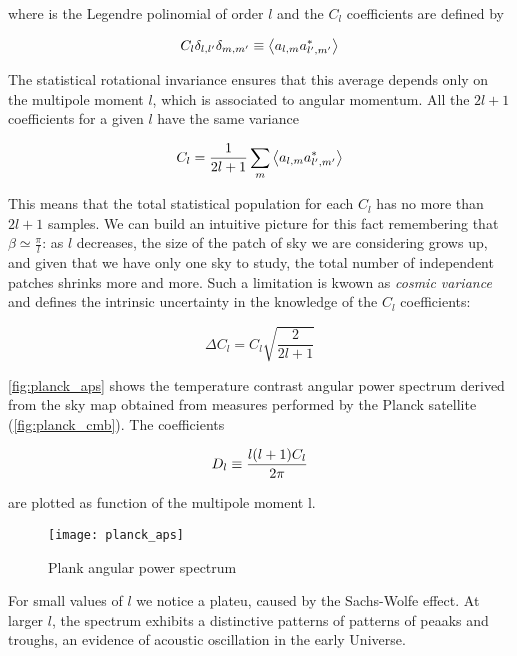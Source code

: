 where is the Legendre polinomial of order $l$ and the $C_l$ coefficients
are defined by

\begin{equation}
        C_l \delta_{l,l'} \delta_{m,m'} \equiv \expval{a_{l,m} a^*_{l',m'}}
\end{equation}

The statistical rotational
invariance ensures that this average depends only on the multipole moment
$l$, which is associated to angular momentum. All the $2l + 1$ coefficients
for a given $l$ have the same variance

\begin{equation}
        C_l = \frac{1}{2l + 1} \sum_m \expval{a_{l,m} a^*_{l',m'}} 
\end{equation}

This means that the total statistical population for each $C_l$ has no more
than $2l + 1$ samples. We can build an intuitive picture for this fact
remembering that $\beta \simeq \frac{\pi}{l}$: as $l$ decreases, the size of
the patch of sky we are considering grows up, and given that we have only
one sky to study, the total number of independent patches shrinks more and
more. Such a limitation is kwown as \emph{cosmic variance} and defines the
intrinsic uncertainty in the knowledge of the $C_l$ coefficients:

\begin{equation}
        \Delta C_l = C_l \sqrt{\frac{2}{2l + 1}} 
\end{equation}

\autoref{fig:planck_aps} shows the temperature contrast angular power
spectrum derived from the sky map obtained from measures performed by the
Planck satellite (\autoref{fig:planck_cmb}). The coefficients 

\begin{equation}
        D_l \equiv \frac{l\qty(l + 1)C_l}{2\pi}
\end{equation}

are plotted as function of the multipole moment l.

\begin{figure}
        \centering
        \texttt{[image: planck\_aps]}
        \caption{Plank angular power spectrum}
        \label{fig:planck_aps}
\end{figure}

For small values of $l$ we notice a plateu, caused by the Sachs-Wolfe
effect. At larger $l$, the spectrum exhibits a distinctive patterns of
patterns of peaaks and troughs, an evidence of acoustic oscillation in the
early Universe.

